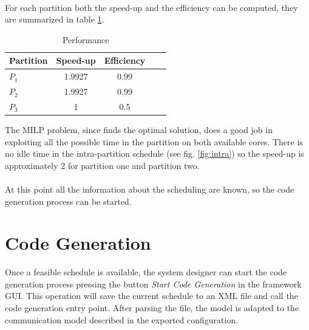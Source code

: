 \paragraph{} For each partition both the speed-up and the efficiency can be computed, they are summarized in table \ref{tab:performance}.
\begin{table}
\begin{center}
\begin{tabular}{lcccc}  
\toprule
Partition & Speed-up & Efficiency \\
\midrule
$P_1$ & 1.9927 & 0.99\\
$P_2$ & 1.9927 & 0.99\\
$P_3$ & 1 & 0.5\\
\bottomrule
\end{tabular}
\caption {Performance}
\label{tab:performance}
\end{center}
\end{table}
The MILP problem, since finds the optimal solution, does a good job in exploiting all the possible time in the partition on both available cores. There is no idle time in the intra-partition schedule (see fig. \ref{fig:intra}) so the speed-up is approximately 2 for partition one and partition two.

\paragraph{} At this point all the information about the scheduling are known, so the code generation process can be started.

\section{Code Generation}
Once a feasible schedule is available, the system designer can start the code generation process pressing the button \emph{Start Code Generation} in the framework GUI. This operation will save the current schedule to an XML file and call the code generation entry point. After parsing the file, the model is adapted to the communication model described in the exported configuration.


